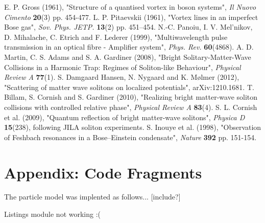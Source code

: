 \documentclass[10pt, twocolumn]{revtex4}    %
\begin{document}
\begin{thebibliography}{}

 E. P. Gross (1961), "Structure of a quantised vortex in boson systems", \textit{Il Nuovo Cimento} 				\textbf{20}(3) pp. 454-477. 
  L. P. Pitaevskii (1961), "Vortex lines in an imperfect Bose gas", \textit{Sov. Phys. JETP.} \textbf{13}(2) 		pp. 451–454.
 N.-C. Panoiu, I. V. Mel’nikov, D. Mihalache, C. Etrich and F. Lederer (1999), "Multiwavelength pulse 			transmission in an optical fibre - Amplifier system", \textit{Phys. Rev.} \textbf{60}(4868). %
 A. D. Martin, C. S. Adams and S. A. Gardiner (2008), "Bright Solitary-Matter-Wave Collisions in a Harmonic 		Trap: Regimes of Soliton-like Behaviour", \textit{Physical Review A} \textbf{77}(1). %
 S. Damgaard Hansen, N. Nygaard and K. Mølmer (2012), "Scattering of matter wave solitons on 			localized potentials", arXiv:1210.1681. %
 T. Billam, S. Cornish and S. Gardiner (2010), "Realizing bright matter-wave soliton collisions with 				controlled relative phase", \textit{Physical Review A} \textbf{83}(4). %
 S. L. Cornish et al. (2009), "Quantum reflection of bright matter-wave solitons", \textit{Physica D} 			\textbf{15}(238), following JILA soliton experiments. 
 S. Inouye et al. (1998), "Observation of Feshbach resonances in a Bose–Einstein condensate", 				\textit{Nature} \textbf{392} pp. 151-154. 

\end{thebibliography} 


\section{Appendix: Code Fragments} \label{Appendix}

The particle model was implented as follows... [include?]

Listings module not working :( 
\end{document}
